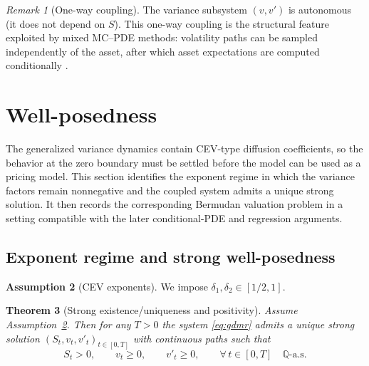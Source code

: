 \documentclass[10pt]{article}
\theoremstyle{plain}
\newtheorem{theorem}{Theorem}[section]
\theoremstyle{definition}
\newtheorem{assumption}[theorem]{Assumption}
\theoremstyle{remark}
\newtheorem{remark}[theorem]{Remark}
\newcommand{\Q}{\mathbb Q}
\begin{document}
\begin{remark}[One-way coupling]\label{rem:one-way}
The variance subsystem $(v,v')$ is autonomous (it does not depend on $S$). This one-way coupling is the structural
feature exploited by mixed MC--PDE methods: volatility paths can be sampled independently of the asset, after which
asset expectations are computed conditionally \citep{farahany2020mixing}.
\end{remark}




\section{Well-posedness}\label{sec:wellposed}

The generalized variance dynamics contain CEV-type diffusion coefficients, so the behavior at the zero boundary must be settled before the model can be used as a pricing model. This section identifies the exponent regime in which the variance factors remain nonnegative and the coupled system admits a unique strong solution. It then records the corresponding Bermudan valuation problem in a setting compatible with the later conditional-PDE and regression arguments.

\subsection{Exponent regime and strong well-posedness}

\begin{assumption}[CEV exponents]\label{ass:delta-range}
We impose $\delta_1,\delta_2\in[1/2,1]$.
\end{assumption}

\begin{theorem}[Strong existence/uniqueness and positivity]\label{thm:wellposed}
Assume Assumption~\ref{ass:delta-range}. Then for any $T>0$ the system \eqref{eq:gdmr} admits a unique strong
solution $(S_t,v_t,v'_t)_{t\in[0,T]}$ with continuous paths such that
\[
S_t>0,\qquad v_t\ge 0,\qquad v'_t\ge 0,\qquad \forall\,t\in[0,T]\quad \Q\text{-a.s.}
\]
\end{theorem}
\end{document}
